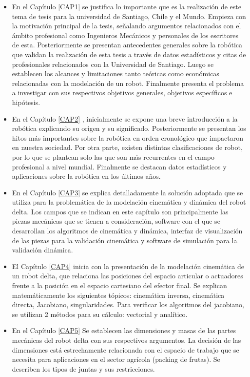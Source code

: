 \begin{itemize}
    \item {En el Capítulo \ref{CAP1} se justifica lo importante que es la realización de este tema de tesis para la universidad de Santiago, Chile y el Mundo. Empieza con la motivación principal de la tesis, señalando argumentos relacionados con el ámbito profesional como Ingenieros Mecánicos y personales de los escritores de esta. Posteriormente se presentan antecedentes generales sobre la robótica que validan la realización de esta tesis a través de datos estadísticos y citas de profesionales relacionados con la Universidad de Santiago. Luego se establecen los alcances y limitaciones tanto teóricas como económicas relacionadas con la modelación de un robot. Finalmente presenta el problema a investigar con sus respectivos objetivos generales, objetivos específicos e hipótesis.}
    \item {En el Capítulo \ref{CAP2} , inicialmente se expone una breve introducción a la robótica explicando su origen y su significado. Posteriormente se presentan los hitos más importantes sobre la robótica en orden cronológico que impactaron en nuestra sociedad. Por otra parte, existen distintas clasificaciones de robot, por lo que se plantean solo las que son más recurrentes en el campo profesional a nivel mundial. Finalmente se destacan datos estadísticos y aplicaciones sobre la robótica en los últimos años.}
    \item {En el Capítulo \ref{CAP3} se explica detalladamente la solución adoptada que se utiliza para la problemática de la modelación cinemática y dinámica del robot delta. Los campos que se indican en este capítulo son principalmente las piezas mecánicas que se tienen a consideración, software con el que se desarrollan los algoritmos de cinemática y dinámica, interfaz de visualización de las piezas para la validación cinemática y software de simulación para la validación dinámica.}
    \item {El Capítulo \ref{CAP4} inicia con la presentación de la modelación cinemática de un robot delta, que relaciona las posiciones del espacio articular o actuadores frente a la posición en el espacio cartesiano del efector final. Se explican matemáticamente los siguientes tópicos: cinemática inversa, cinemática directa, Jacobiano, singularidades. Para verificar los algoritmos del jacobiano, se utilizan 2 métodos para su cálculo: vectorial y analítico. }
    \item {En el Capítulo \ref{CAP5} Se establecen las dimensiones y masas de las partes mecánicas del robot delta con sus respectivos argumentos. La decisión de las dimensiones está estrechamente relacionada con el espacio de trabajo que se necesita para aplicaciones en el sector agrícola (packing de frutas). Se describen los tipos de juntas y sus restricciones.}

\end{itemize}
